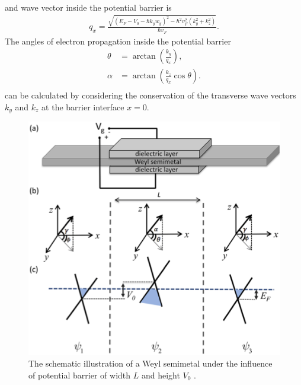     and wave vector inside the potential barrier is
    \begin{align} \label{2eq:inside wavevector}
        q_x = \frac{\sqrt{(E_F-V_0-\hbar k_y w_y)^2 - \hbar^2 v_F^2 (k_y^2 + k_z^2)}}{\hbar v_F}.
    \end{align}
    The angles of electron propagation inside the potential barrier 
    \begin{equation} \label{2eq:angles}
        \begin{aligned}
            \theta &= \arctan{\left(\frac{k_y}{q_x}\right)},\\
            \alpha &= \arctan{\left(\frac{k_z}{q_x} \cos{\theta}\right)}.\\
        \end{aligned}
    \end{equation}
    can be calculated by considering the conservation of the transverse wave vectors $k_y$ and $k_z$ at the barrier interface $x = 0$. 
    \begin{figure}[H] 
        \centering
        \includegraphics[width = 0.6\linewidth]{fig/Chap 2/2transistor.png}
        \caption{The schematic illustration of a Weyl semimetal under the influence of potential barrier of width $L$ and height $V_0$ \cite{Yesilyurt2017a}.}
        \label{2fig:weyl transistor}
    \end{figure}


